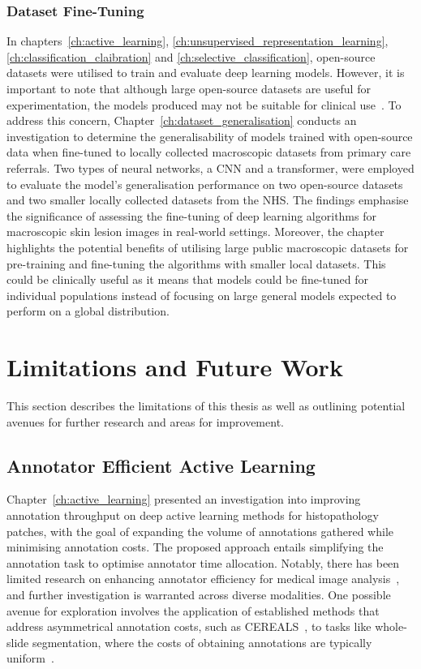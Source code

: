 \subsubsection{Dataset Fine-Tuning}
In chapters~\ref{ch:active_learning}, \ref{ch:unsupervised_representation_learning}, \ref{ch:classification_claibration} and \ref{ch:selective_classification}, open-source datasets were utilised to train and evaluate deep learning models. However, it is important to note that although large open-source datasets are useful for experimentation, the models produced may not be suitable for clinical use~\citep{wu2022skin}. To address this concern, Chapter~\ref{ch:dataset_generalisation} conducts an investigation to determine the generalisability of models trained with open-source data when fine-tuned to locally collected macroscopic datasets from primary care referrals. Two types of neural networks, a CNN and a transformer, were employed to evaluate the model’s generalisation performance on two open-source datasets and two smaller locally collected datasets from the NHS. The findings emphasise the significance of assessing the fine-tuning of deep learning algorithms for macroscopic skin lesion images in real-world settings. Moreover, the chapter highlights the potential benefits of utilising large public macroscopic datasets for pre-training and fine-tuning the algorithms with smaller local datasets. This could be clinically useful as it means that models could be fine-tuned for individual populations instead of focusing on large general models expected to perform on a global distribution.



\section{Limitations and Future Work}
This section describes the limitations of this thesis as well as outlining potential avenues for further research and areas for improvement.

\subsection{Annotator Efficient Active Learning}
Chapter~\ref{ch:active_learning} presented an investigation into improving annotation throughput on deep active learning methods for histopathology patches, with the goal of expanding the volume of annotations gathered while minimising annotation costs. The proposed approach entails simplifying the annotation task to optimise annotator time allocation. Notably, there has been limited research on enhancing annotator efficiency for medical image analysis~\citep{ren2021survey}, and further investigation is warranted across diverse modalities. One possible avenue for exploration involves the application of established methods that address asymmetrical annotation costs, such as CEREALS~\citep{mackowiak2018cereals}, to tasks like whole-slide segmentation, where the costs of obtaining annotations are typically uniform~\citep{budd2021survey}.

